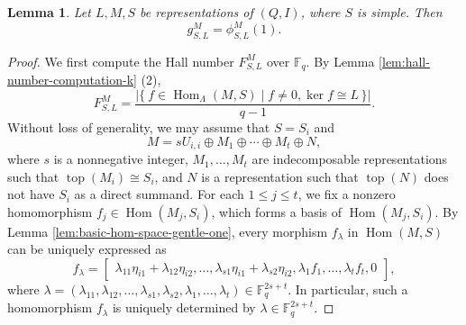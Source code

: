 \documentclass[12pt]{amsart}
\newtheorem{lemma}[theorem]{Lemma}
\theoremstyle{remark}
\theoremstyle{definition}
\numberwithin{equation}{section}
\newcommand{\Hom}{\operatorname{Hom}\nolimits}
\begin{document}
\begin{lemma}\label{lem:simple-hall-number-F1}
Let $L,M,S$ be representations of $(Q,I)$, where $S$ is simple. Then \[g_{S,L}^M=\phi_{S,L}^M(1).\]
\end{lemma}
\begin{proof}
We first compute the Hall number $F_{S,L}^M$ over $\mathbb{F}_q$. By Lemma \ref{lem:hall-number-computation-k} (2), 
\[
F^M_{S,L}
=
\frac{
\left|
\{\ f\in \operatorname{Hom}_\Lambda(M,S)\mid f\neq 0, \ker f\cong L\,\}
\right|
}
{q-1}.
\]
Without loss of generality, we may assume that $S=S_i$ and \[M=sU_{i,i}\oplus M_1\oplus \cdots \oplus M_t\oplus N,\]
where $s$ is a nonnegative integer,  $M_1,\ldots, M_t$ are indecomposable representations such that $\operatorname{top}(M_i)\cong S_i$, and $N$ is a representation such that $\operatorname{top}(N)$ does not have $S_i$ as a direct summand.  For each $1\leq j\leq t$, we fix a nonzero homomorphism $f_j\in \Hom(M_j,S_i)$, which forms a basis of $\Hom(M_j,S_i)$. By Lemma \ref{lem:basic-hom-space-gentle-one}, every morphism $f_\lambda$ in $\Hom(M,S)$ can be uniquely expressed as 
\[
f_{\lambda}=\begin{bmatrix}
    \lambda_{11}\eta_{i1}+\lambda_{12}\eta_{i2},\ldots, \lambda_{s1}\eta_{i1}+\lambda_{s2}\eta_{i2}, \lambda_1f_1,\ldots, \lambda_tf_t,0
\end{bmatrix},
\]
where $\lambda=(\lambda_{11},\lambda_{12},\ldots, \lambda_{s1},\lambda_{s2}, \lambda_1,\ldots, \lambda_t)\in \mathbb{F}_q^{2s+t}$. In particular, such a homomorphism $f_\lambda$ is uniquely determined by $\lambda\in \mathbb{F}_q^{2s+t}$. 


\end{proof}
\end{document}

